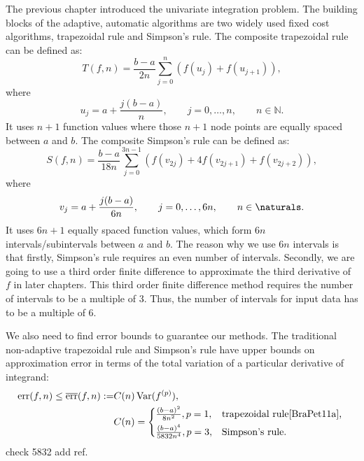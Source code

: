 \documentclass{iitthesis}
\DeclareMathOperator{\Var}{Var}
\theoremstyle{definition}
\theoremstyle{remark}
\begin{document}


The previous chapter introduced the univariate integration problem. The building blocks of the adaptive, automatic algorithms are two widely used fixed cost algorithms, trapezoidal rule and Simpson's rule.
The composite trapezoidal rule can be defined as:
\begin{equation}\label{traprule}
  T(f,n)=\frac{b-a}{2n}\sum_{j=0}^{n}(f(u_{j})+f(u_{j+1})),
\end{equation}
where
\begin{equation}\label{upts}
u_j=a+\frac{j(b-a)}{n}, \qquad j=0, \ldots, n, \qquad n\in\mathbb{N}.
\end{equation}
It uses $n+1$ function values where those $n+1$ node points are equally spaced between $a$ and $b$. The composite Simpson's rule can be defined as:
\begin{equation}\label{simrule}
  S(f,n)=\frac{b-a}{18n}\sum_{j=0}^{3n-1}(f(v_{2j})+4f(v_{2j+1})+f(v_{2j+2})),
\end{equation}
where
\begin{equation}\label{vpts}
v_j=a+\frac{j(b-a)}{6n}, \qquad j=0, \ldots, 6n, \qquad n\in \naturals.
\end{equation}
It uses $6n+1$ equally spaced function values, which form $6n$ intervals/subintervals between $a$ and $b$. The reason why we use $6n$ intervals is that firstly, Simpson's rule requires an even number of intervals. Secondly, we are going to use a third order finite difference to approximate the third derivative of $f$ in later chapters. This third order finite difference method requires the number of intervals to be a multiple of 3. Thus, the number of intervals for input data has to be a multiple of 6.

We also need to find error bounds to guarantee our methods. The traditional non-adaptive trapezoidal rule and Simpson's rule have upper bounds on approximation error in terms of the total variation of a particular derivative of integrand:
\begin{align}\label{errorbound}
    \text{err}(f,n)\le\overline{\text{err}}(f,n):=&C(n)\Var(f^{(p)}),\\
    \nonumber&C(n)=
    \begin{cases*}
           \frac{(b-a)^2}{8n^2}, p=1,  & \mbox{trapezoidal rule}\cite[(7.15)]{BraPet11a}, \\
           \frac{(b-a)^4}{5832n^4}, p=3, & \mbox{Simpson's rule}.
    \end{cases*}
\end{align}
check 5832 add ref.
\end{document}
